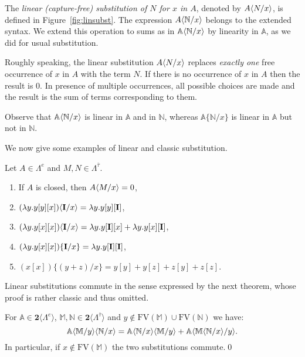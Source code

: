 \documentclass{LMCS}
\newcommand{\bool}{\mathbf{2}}
\newcommand{\lam}{\ensuremath{\lambda}}
\newcommand{\FV}{\mathrm{FV}}
\newcommand{\Set}[1]{\Lambda^{#1}}
\newcommand{\sums}[1]{\bool\langle\Set{#1}\rangle}
\newcommand{\subst}[2]{\{ #2 / #1 \}}	\newcommand{\dg}[2]{\mathrm{deg}_{#1}(#2)} \newcommand{\obsle}{\sqsubseteq_{\mathcal{O}}}
\newcommand{\sA}{\mathbb{A}}
\newcommand{\sM}{\mathbb{M}}
\newcommand{\sN}{\mathbb{N}}
\newcommand{\gto}{\ensuremath{\bar\tau}}
\begin{document}
\begin{defi} The \emph{linear (capture-free) substitution of $N$ for $x$ in $A$}, denoted by $A\lsubst{x}{N}$, is defined 
in Figure~\ref{fig:linsubst}.
The expression $A\lsubst{x}{\sN}$ belongs to the extended syntax. We extend this operation 
to sums as in $\sA\lsubst{x}{\sN}$ by linearity in $\sA$, as we did for usual substitution.
\end{defi}

Roughly speaking, the linear substitution $A\lsubst{x}{N}$ replaces 
\emph{exactly one} free occurrence of $x$ in $A$ with the term $N$.
If there is no occurrence of $x$ in $A$ then the result is 0.
In presence of multiple occurrences, all possible choices are made and the result is the sum of terms corresponding to them.

\begin{rem}
Observe that  $\sA\lsubst{x}{\sN}$ is linear in $\sA$ and in $\sN$, 
whereas  $\sA\subst{x}{\sN}$ is linear in $\sA$ but not in  $\sN$.
\end{rem}

We now give some examples of linear and classic substitution.

\begin{exa} Let $A\in\Set{e}$ and $M,N\in\Set{\gto}$.
\begin{enumerate}[1.]
\item If $A$ is closed, then $A\lsubst{x}{M} =0$,
\item $(\lam y.y[y][x])\lsubst{x}{\bold{I}} = \lam y.y[y][\bold{I}]$,
\item $(\lam y.y[x][x])\lsubst{x}{\bold{I}} = \lam y.y[\bold{I}][x] + \lam y.y[x][\bold{I}]$,
\item $(\lam y.y[x][x])\subst{x}{\bold{I}} = \lam y.y[\bold{I}][\bold{I}]$,
\item $(x[x])\subst{x}{(y + z)} =  y[y] + y[z] + z[y] + z[z]$.
\end{enumerate}
\end{exa}

Linear substitutions commute in the sense expressed by the next theorem, 
whose proof is rather classic and thus omitted.

\begin{thm}\label{thm:Schwarz}
For $\sA\in\sums{e}$, $\sM,\sN\in\sums{\gto}$ and $y\notin\FV(\sM)\cup\FV(\sN)$ we have:
$$
	\sA\lsubst{y}{\sM}\lsubst{x}{\sN} = \sA\lsubst{x}{\sN}\lsubst{y}{\sM} + \sA\lsubst{y}{\sM\lsubst{x}{\sN}}.
$$
In particular, if $x\notin\FV(\sM)$ the two substitutions commute.\qed
\end{thm}
\end{document}

